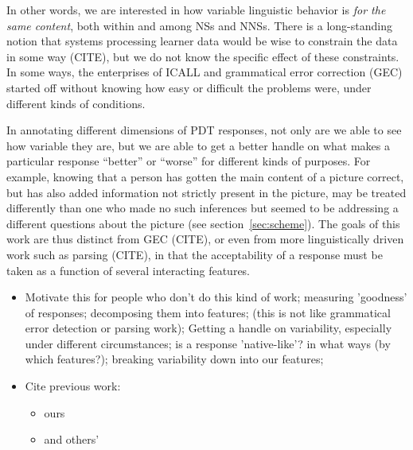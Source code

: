 \documentclass[11pt,a4paper]{article}
\begin{document}

In other words, we are interested in how variable linguistic behavior
is \emph{for the same content}, both within and among NSs and NNSs.
There is a long-standing notion that systems processing learner data
would be wise to constrain the data in some way (CITE), but we do not
know the specific effect of these constraints.  In some ways, the
enterprises of ICALL and grammatical error correction (GEC) started
off without knowing how easy or difficult the problems were, under
different kinds of conditions.

In annotating different dimensions of PDT responses, not only are we
able to see how variable they are, but we are able to get a better
handle on what makes a particular response ``better'' or ``worse'' for
different kinds of purposes.  For example, knowing that a person has
gotten the main content of a picture correct, but has also added
information not strictly present in the picture, may be treated
differently than one who made no such inferences but seemed to be
addressing a different questions about the picture (see section~\ref{sec:scheme}).
The goals of this work are thus distinct from GEC (CITE), or even from
more linguistically driven work such as parsing (CITE), in that the
acceptability of a response must be taken as a function of several
interacting features.

\begin{itemize}
\item Motivate this for people who don't do this kind of work; measuring 'goodness' of responses; decomposing them into features; (this is not like grammatical error detection or parsing work); Getting a handle on variability, especially under different circumstances; is a response 'native-like'? in what ways (by which features?); breaking variability down into our features;
\item Cite previous work:
  \begin{itemize}
  \item ours \citep{king:dickinson:13} 
  \item and others' \citep{somasundaran:ea:15}
  \end{itemize}
\end{itemize}
\end{document}
